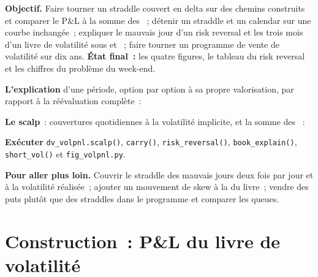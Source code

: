 \begin{tutorial}
\textbf{Objectif.} Faire tourner un straddle couvert en delta sur des chemins construits et comparer le P\&L à la somme des ~; détenir un straddle et un calendar sur une
courbe inchangée~; expliquer le mauvais jour d'un risk reversal et les trois mois d'un livre de volatilité sous  et ~; faire tourner un programme de vente de
volatilité sur dix ans. \textbf{État final~:} les quatre figures, le tableau du risk reversal et les chiffres du problème du week-end.
\begin{tutsteps}
\item \textbf{L'explication} d'une période, option par option à sa propre valorisation, par rapport à la réévaluation complète~:
\label{lst:dv:trading-volatility:explain}
\item \textbf{Le scalp}~: couvertures quotidiennes à la volatilité implicite, et la somme des ~:
\label{lst:dv:trading-volatility:scalp}
\item \textbf{Exécuter} \texttt{dv\_volpnl.scalp()}, \texttt{carry()}, \texttt{risk\_reversal()}, \texttt{book\_explain()}, \texttt{short\_vol()} et
\texttt{fig\_volpnl.py}.
\end{tutsteps}
\textbf{Pour aller plus loin.} Couvrir le straddle des mauvais jours deux fois par jour et à la volatilité réalisée~; ajouter un mouvement de skew à la  du livre~; vendre
des puts plutôt que des straddles dans le programme et comparer les queues.
\end{tutorial}

\section{Construction~: P\&L du livre de volatilité}\label{bld:dv:trading-volatility:volpnl}

